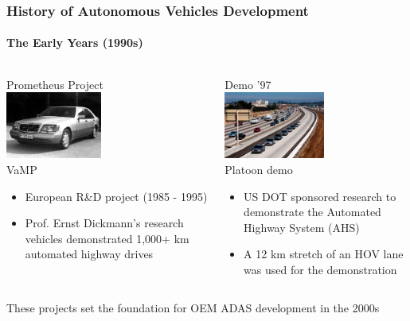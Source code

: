 \begin{frame}
\frametitle{History of Autonomous Vehicles Development}
\framesubtitle{The Early Years (1990s)}
\begin{columns}[T]
    \begin{column}{.5\textwidth}
    \centering
    Prometheus Project \\
    \vspace{0.25cm}
    \includegraphics[height=2.2cm]{images/vamp.jpg} \\
    \tiny{\cite{Dickmanns1994} VaMP}
    \footnotesize
    \begin{itemize}
        \item European R\&D project (1985 - 1995)
        \item Prof. Ernst Dickmann's research vehicles
            demonstrated 1,000+ km automated highway drives
    \end{itemize}
    \end{column}
    \pause
    \begin{column}{.5\textwidth}
    \centering
    Demo '97 \\
    \vspace{0.25cm}
    \includegraphics[height=2.2cm]{images/demo-97-no-hands.png} \\
    \tiny{Platoon demo}\footnotemark[1]
    \footnotesize
    \begin{itemize}
        \item US DOT sponsored research to demonstrate the
            Automated Highway System (AHS)
        \item A 12 km stretch of an HOV lane was used for the demonstration
    \end{itemize}
    \end{column}
\end{columns}
\pause
\footnotesize
\begin{block}{}
These projects set the foundation for OEM ADAS development in the
2000s
\end{block}
\end{frame}

